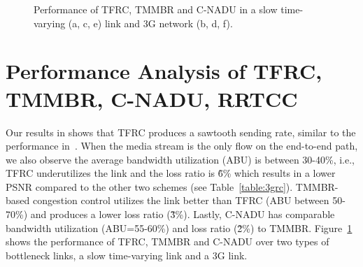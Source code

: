 \begin{figure}[!t]
  \centerline{
  }
  \centerline{
  }
  \centerline{
  }
  \caption{Performance of TFRC, TMMBR and C-NADU in a slow time-varying (a, c,
  e) link and 3G network (b, d, f).}
  \label{fig:3grc}
\end{figure}

\section{Performance Analysis of TFRC, TMMBR, C-NADU, RRTCC}

Our results in  shows that TFRC produces a sawtooth sending
rate, similar to the performance in~\cite{saurin:2006:thesis}. When the media
stream is the only flow on the end-to-end path, we also observe the average
bandwidth utilization (ABU) is between 30-40\%, i.e., TFRC underutilizes the
link and the loss ratio is \~6\% which results in a lower PSNR compared to the
other two schemes (see Table~\ref{table:3grc}). TMMBR-based congestion control
utilizes the link better than TFRC (ABU between 50-70\%) and produces a lower
loss ratio (\~3\%). Lastly, C-NADU has comparable bandwidth utilization
(ABU=55-60\%) and loss ratio (\~2\%) to TMMBR. Figure~\ref{fig:3grc} shows the
performance of TFRC, TMMBR and C-NADU over two types of bottleneck links, a
slow time-varying link and a 3G link.

\begin{table}
\caption{Comparing TFRC, TMMBR, C-NADU for calls over mobile nodes (180s
simulations using 3G traces).}
\label{table:3grc}
\end{table}



